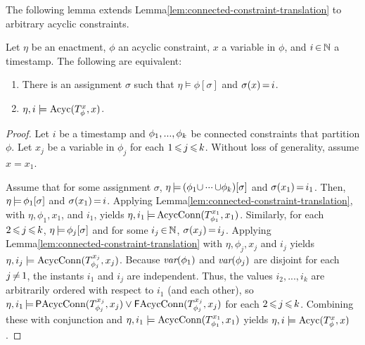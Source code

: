 The following lemma extends
Lemma\:\ref{lem:connected-constraint-translation}
to arbitrary acyclic constraints.

\begin{lemma}\label{lem:acyclic-constraint-translation}
  Let $\eta$ be an enactment,
  $\phi$ an acyclic constraint,
  $x$ a variable in $\phi$, and
  $i\,{\in}\,\mathbb{N}$ a timestamp.
  The following are equivalent:
  \begin{enumerate}
  \item
    There is an assignment $\sigma$ such that
    $\eta\models\phi[\sigma]$ and $\sigma(x)\,{=}\,i$.
  \item
    $\eta, i \models \text{Acyc}(T_\phi^{x},x)$.
  \end{enumerate}
\end{lemma}

\begin{proof}
  Let $i$ be a timestamp and
  $\phi_1,...,\phi_{k}$ be connected constraints
  that partition $\phi$.
  Let $x_j$ be a variable in $\phi_j$
  for each $1\,{\leqslant}\, j\,{\leqslant}\, k$.
  Without loss of generality,
  assume $x=x_1$.

  Assume that for some assignment $\sigma$,
  $\eta\,{\models}\,(\phi_1{\cup}\,{\cdot}{\cdot}{\cdot}\,{\cup}\phi_k)[\sigma]$
  and $\sigma(x_1)\,{=}\,i_1$.
  Then,
  $\eta\,{\models}\,\phi_1[\sigma]$ and $\sigma(x_1)\,{=}\,i$.
  Applying Lemma\:\ref{lem:connected-constraint-translation},
  with $\eta,\phi_1, x_1$, and $i_1$,
  yields
  $\eta,i_1\,{\models}\,\text{AcycConn}(T_{\phi_1}^{x_1},x_1)$.
  Similarly,
  for each $2\,{\leqslant}\, j\,{\leqslant}\, k$,
  $\eta\,{\models}\,\phi_j[\sigma]$ and
  for some $i_j\,{\in}\,\mathbb{N}$,
  $\sigma(x_j)\,{=}\,i_j$.
  Applying Lemma\:\ref{lem:connected-constraint-translation}
  with $\eta,\phi_j, x_j$ and $i_j$
  yields
  $\eta,i_j\models\text{AcycConn}(T_{\phi_j}^{x_j},x_j)$.
  Because $\textit{var}(\phi_1)$ and $\textit{var}(\phi_j)$ are 
  disjoint for each $j\,{\neq}\, 1$,
  the instants $i_1$ and $i_j$ are independent.
  Thus, the values $i_2,...,i_k$ are arbitrarily ordered
  with respect to $i_1$ (and each other),
  so
  $\eta,i_1\,{\models}\,\textsf{P}\text{AcycConn}(T_{\phi_j}^{x_j},x_j)\lor
  \textsf{F}\text{AcycConn}(T_{\phi_j}^{x_j},x_j)$
  for each $2\,{\leqslant}\, j\,{\leqslant}\, k$.
  Combining these with conjunction and
  $\eta,i_1\models\text{AcycConn}(T_{\phi_1}^{x_1},x_1)$
  yields $\eta, i \models \text{Acyc}(T_\phi^{x},x)$.
  

\end{proof}
